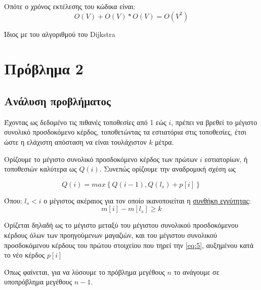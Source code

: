 \documentclass[11pt]{article}
\begin{document}
Οπότε ο χρόνος εκτέλεσης του κώδικα είναι:
\begin{equation}
\label{equdijstra}
O(V) + O(V)*O(V) = O(V^2)
\end{equation}

Ίδιος με του αλγοριθμού του Dijkstra
\section{Πρόβλημα 2}
\label{sec:org320b3f5}
\subsection{Ανάλυση προβλήματος}
\label{sec:org60048cc}
Έχοντας ως δεδομένο τις πιθανές τοποθεσίες από 1 εώς \(i\), πρέπει να βρεθεί το
μέγιστο συνολικό προσδοκόμενο κέρδος, τοποθετώντας τα εστιατόρια στις
τοποθεσίες, έτσι ώστε η ελάχιστη απόσταση να είναι τουλάχιστον \(k\) μέτρα.

Ορίζουμε το μέγιστο συνολικό προσδοκόμενο κέρδος των πρώτων \(i\) εστιατορίων, ή
τοποθεσιών καλύτερα ως \(Q(i)\). Συνεπώς ορίζουμε την αναδρομική σχέση ως

\begin{equation}
\label{eq:1}
Q(i) = max \left\{ Q(i-1) , Q(l_s) + p[i] \right\}
\end{equation}

Όπου: \(l_s < i\) ο μέγιστος ακέραιος για τον οποίο ικανοποιείται η \uline{συνθήκη
εγγύτητας}: 
\begin{equation}
\label{eq:5}
m[i] - m[l_{s}] \geq k
\end{equation}

Ορίζεται δηλαδή ως το μέγιστο μεταξύ του μέγιστου συνολικού προσδοκόμενου
κέρδους όλων των προηγούμενων μαγαζιών, και του μέγιστου συνολικού προσδοκόμενου
κέρδους του πρώτου στοιχείου που τηρεί την \eqref{eq:5}, αυξημένου κατά το νέο
κέρδος \(p[i]\)

Όπως φαίνεται, για να λύσουμε το πρόβλημα μεγέθους \(n\) το ανάγουμε σε
υποπρόβλημα μεγέθους \(n-1\).
\end{document}

